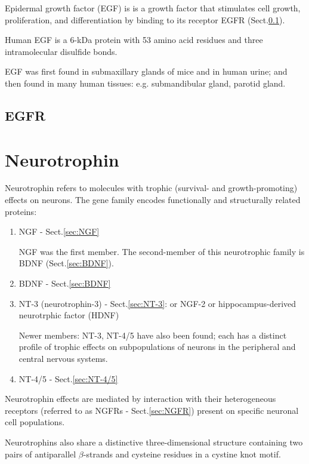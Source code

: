 Epidermal growth factor (EGF) is  is a growth factor that stimulates cell
growth, proliferation, and differentiation by binding to its receptor EGFR
(Sect.\ref{sec:EGFR}).

Human EGF is a 6-kDa protein with 53 amino acid residues and three
intramolecular disulfide bonds.

EGF was first found in submaxillary glands of mice and in human urine; and then
found in many human tissues: e.g. submandibular gland, parotid gland.

\subsection{EGFR}
\label{sec:EGFR}



\section{Neurotrophin}
\label{sec:neurotrophin}

Neurotrophin refers to molecules with trophic (survival- and growth-promoting)
effects on neurons. The gene family encodes functionally and structurally
related proteins:

\begin{enumerate}
  \item NGF - Sect.\ref{sec:NGF}

NGF was the first member. The second-member of this neurotrophic family is BDNF
(Sect.\ref{sec:BDNF}). 
  
  \item BDNF - Sect.\ref{sec:BDNF}
  
  \item NT-3 (neurotrophin-3) - Sect.\ref{sec:NT-3}: or NGF-2 or
  hippocampus-derived neurotrphic factor (HDNF)

Newer members: NT-3, NT-4/5 have also been found; each
has a distinct profile of trophic effects on subpopulations of neurons in the
peripheral and central nervous systems.
  
  \item NT-4/5 - Sect.\ref{sec:NT-4/5}
\end{enumerate}
Neurotrophin effects are mediated by interaction with their heterogeneous
receptors (referred to as NGFRs - Sect.\ref{sec:NGFR}) present on specific
neuronal cell populations.

Neurotrophins also share a distinctive three-dimensional structure containing
two pairs of antiparallel $\beta$-strands and cysteine residues in a cystine
knot motif.

